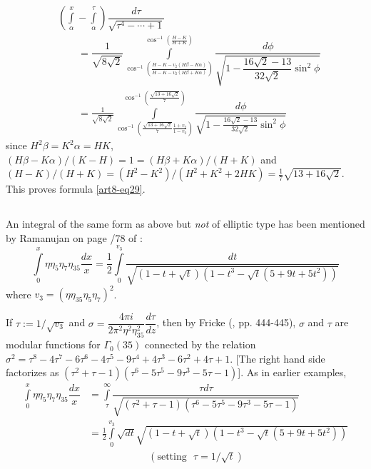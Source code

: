 \begin{align*}
&\left(\int\limits^{x}_{\alpha}-\int\limits^{\tau}_{\alpha}\right)\dfrac{d\tau}{\sqrt{\tau^{4}-\cdots+1}}\\[8pt]
&\qquad =\dfrac{1}{\sqrt{8\sqrt{2}}}\int\limits^{\cos^{-1}\left(\frac{H-K}{H+K}\right)}_{\cos^{-1}\left(\frac{H-K-v_{2}(H\beta-K\alpha)}{H-K-v_{2}(H\beta+K\alpha)}\right)}\dfrac{d\phi}{\sqrt{1-\dfrac{16\sqrt{2}-13}{32\sqrt{2}}\sin^{2}\phi}}\\[8pt]
&\qquad =\frac{1}{\sqrt{8\sqrt{2}}}\int\limits^{\cos^{-1}\left(\frac{\sqrt{13+16\sqrt{2}}}{7}\right)}_{\cos^{-1}\left(\frac{\sqrt{13+16\sqrt{2}}}{7}\frac{1+v_{2}}{1-v_{2}}\right)}\dfrac{d\phi}{\sqrt{1-\frac{16\sqrt{2}-13}{32\sqrt{2}}\sin^{2}\phi}}
\end{align*}
since $H^{2}\beta=K^{2}\alpha=HK$, $(H\beta-K\alpha)/(K-H)=1=(H\beta+K\alpha)/(H+K)$ and $(H-K)/(H+K)=(H^{2}-K^{2})/(H^{2}+K^{2}+2HK)=\frac{1}{7}\sqrt{13+16\sqrt{2}}$. This proves formula \eqref{art8-eq29}.

\subsection{}\label{art8-sec3.3}
An integral of the same form as above but {\em not} of elliptic type has been mentioned by Ramanujan on page /78 of \cite{art8-key11} :
\begin{equation}
\int\limits^{x}_{0}\eta\eta_{5}\eta_{7}\eta_{35}\dfrac{dx}{x}=\frac{1}{2}\int\limits^{v_{3}}_{0}\dfrac{dt}{\sqrt{(1-t+\sqrt{t})(1-t^{3}-\sqrt{t}(5+9t+5t^{2}))}}\label{art8-eq31}
\end{equation}
where $v_{3}=(\eta\eta_{35}\eta_{5}\eta_{7})^{2}$.

If $\tau := 1/\sqrt{v_{3}}$ and $\sigma=\dfrac{4\pi i}{2\pi^{2}\eta^{2}\eta^{2}_{35}}\dfrac{d\tau}{dz}$, then by Fricke (\cite{art8-key3}, pp. 444-445), $\sigma$ and $\tau$ are modular functions for $\Gamma_{0}(35)$ connected by the relation $\sigma^{2}=\tau^{8}-4\tau^{7}-6\tau^{6}-4\tau^{5}-9\tau^{4}+4\tau^{3}-6\tau^{2}+4\tau+1$. [The right hand side factorizes as $(\tau^{2}+\tau-1)(\tau^{6}-5\tau^{5}-9\tau^{3}-5\tau-1)$]. As in earlier examples,
\begin{align*}
\int\limits^{x}_{0}\eta\eta_{5}\eta_{7}\eta_{35}\dfrac{dx}{x} &= \int\limits^{\infty}_{\tau}\dfrac{\tau d\tau}{\sqrt{(\tau^{2}+\tau-1)(\tau^{6}-5\tau^{5}-9\tau^{3}-5\tau-1)}}\\
&= \frac{1}{2}\int\limits^{v_{3}}_{0}\sqrt{dt}{\sqrt{(1-t+\sqrt{t})(1-t^{3}-\sqrt{t}(5+9t+5t^{2}))}}\\
&\qquad\qquad\qquad (\text{setting~ } \tau=1/\sqrt{t})
\end{align*}\pageoriginale

